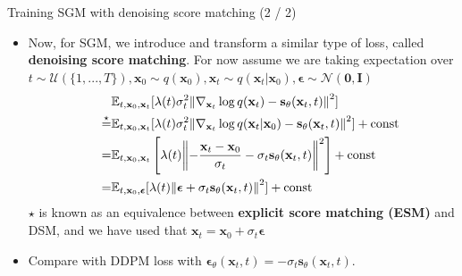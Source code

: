 \documentclass{beamer}
\begin{document}
\begin{frame}{Training SGM with denoising score matching (2 / 2)}
  \begin{itemize}
  \item Now, for SGM, we introduce and transform a similar type of loss, called \textbf{denoising score matching}. For now assume we are taking expectation over $t \sim \mathcal{U}(\{1,...,T\}), \mathbf{x}_0\sim q(\mathbf{x}_0), \mathbf{x}_t \sim q(\mathbf{x}_t |\mathbf{x}_0), \boldsymbol{\epsilon} \sim \mathcal{N}(\mathbf{0}, \mathbf{I})$
  \begin{align}
    \quad \quad &\mathbb{E}_{t, \mathbf{x}_0, \mathbf{x}_t}[\lambda(t)\sigma_t^2 \norm{\nabla_{\mathbf{x}_t}\log q(\mathbf{x}_t) - \mathbf{s}_\theta (\mathbf{x}_t, t) }^2] \\
    \overset{\star}{=}&\mathbb{E}_{t, \mathbf{x}_0, \mathbf{x}_t}[\lambda(t)\sigma_t^2 \norm{\nabla_{\mathbf{x}_t}\log q(\mathbf{x}_t|\mathbf{x}_0) - \mathbf{s}_\theta (\mathbf{x}_t, t) }^2] + \text{const} \\
    =&\mathbb{E}_{t, \mathbf{x}_0, \mathbf{x}_t}\left[\lambda(t)\norm{-\frac{\mathbf{x}_t -\mathbf{x}_0}{\sigma_t} - \sigma_t\mathbf{s}_\theta (\mathbf{x}_t, t)}^2\right]+ \text{const} \\
    =&\mathbb{E}_{t, \mathbf{x}_0, \boldsymbol{\epsilon}}[\lambda(t)\norm{\boldsymbol{\epsilon} + \sigma_t\mathbf{s}_\theta (\mathbf{x}_t, t)}^2]+ \text{const}
  \end{align}
  $\star$ is known as an equivalence between \textbf{explicit score matching (ESM)} and DSM, and we have used that $\mathbf{x}_t = \mathbf{x}_0 + \sigma_t \boldsymbol{\epsilon}$
    \item Compare with DDPM loss with $\boldsymbol{\epsilon}_\theta(\mathbf{x}_t, t) = - \sigma_t \mathbf{s}_\theta (\mathbf{x}_t, t)$.
  \end{itemize}
\end{frame}
\end{document}
